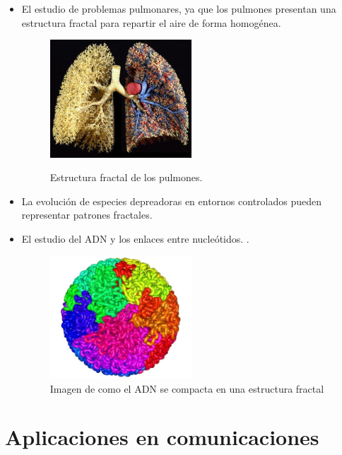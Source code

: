 \begin{itemize}
    \item El estudio de problemas pulmonares, ya que los pulmones presentan una estructura fractal para repartir el aire de forma homogénea.\cite{BBVA-2020}
    
    \begin{figure}[H]
        \centering
        \includegraphics[width=0.5\textwidth]{figures/lungs-fractal.jpg}
        \caption{Estructura fractal de los pulmones.} \cite{BBVA-2020}
        \label{fig:lungs}
    \end{figure}

    \item La evolución de especies depreadoras en entornos controlados pueden representar patrones fractales. \cite{fractales-img}
    
    \item El estudio del ADN y los enlaces entre nucleótidos. \cite{ADN}.
    
    \begin{figure}[H]
        \centering
        \includegraphics[width=0.5\textwidth]{figures/fractal-genome.jpg}
        \caption{Imagen de como el ADN se compacta en una estructura fractal}
        \label{fig:fractal-genome}
    \end{figure}
\end{itemize}

\section{Aplicaciones en comunicaciones}

